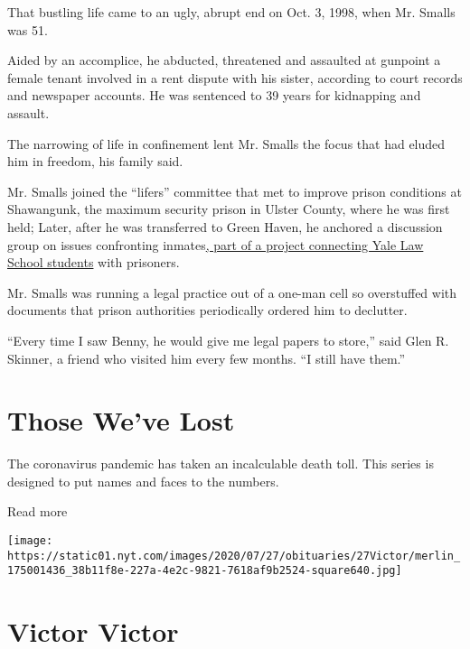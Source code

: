 That bustling life came to an ugly, abrupt end on Oct. 3, 1998, when Mr.
Smalls was 51.

Aided by an accomplice, he abducted, threatened and assaulted at
gunpoint a female tenant involved in a rent dispute with his sister,
according to court records and newspaper accounts. He was sentenced to
39 years for kidnapping and assault.

The narrowing of life in confinement lent Mr. Smalls the focus that had
eluded him in freedom, his family said.

Mr. Smalls joined the ``lifers'' committee that met to improve prison
conditions at Shawangunk, the maximum security prison in Ulster County,
where he was first held; Later, after he was transferred to Green Haven,
he anchored a discussion group on issues confronting
inmates\href{https://law.yale.edu/student-life/student-journals-organizations/student-organizations/green-haven-prison-project}{,
part of a project connecting Yale Law School students} with prisoners.

Mr. Smalls was running a legal practice out of a one-man cell so
overstuffed with documents that prison authorities periodically ordered
him to declutter.

``Every time I saw Benny, he would give me legal papers to store,'' said
Glen R. Skinner, a friend who visited him every few months. ``I still
have them.''

\href{https://www.nytimes.com/interactive/2020/obituaries/people-died-coronavirus-obituaries.html?action=click\&pgtype=Article\&state=default\&region=BELOW_MAIN_CONTENT\&context=covid_obits_promo}{}

\hypertarget{those-weve-lost}{%
\section{Those We've Lost}\label{those-weve-lost}}

The coronavirus pandemic has taken an incalculable death toll. This
series is designed to put names and faces to the numbers.

Read more

\texttt{[image: https://static01.nyt.com/images/2020/07/27/obituaries/27Victor/merlin\_175001436\_38b11f8e-227a-4e2c-9821-7618af9b2524-square640.jpg]}

\hypertarget{victor-victor}{%
\section{Victor Victor}\label{victor-victor}}

